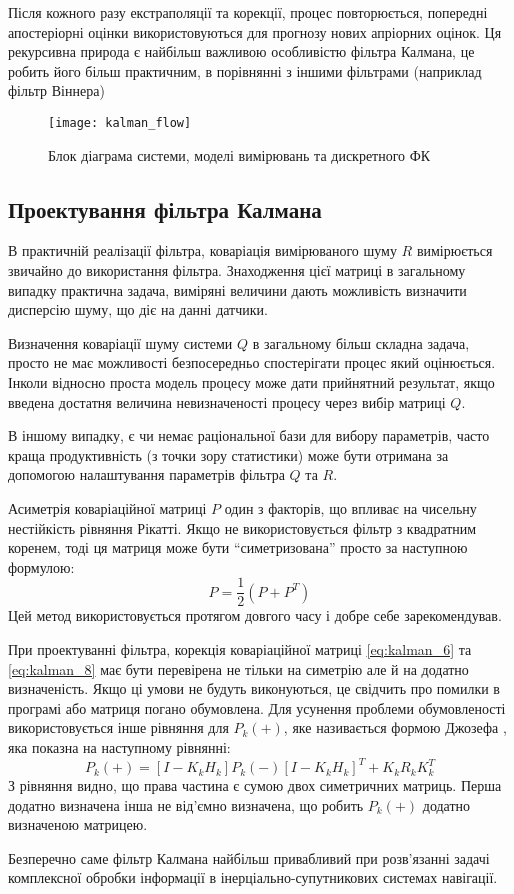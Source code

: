 Після кожного разу екстраполяції та корекції, процес повторюється, попередні
апостеріорні оцінки використовуються для прогнозу нових апріорних оцінок.
Ця рекурсивна природа є найбільш важливою особливістю фільтра Калмана, це робить
його більш практичним, в порівнянні з іншими фільтрами (наприклад фільтр Віннера)
\begin{figure}[here]
\centering
\texttt{[image: kalman\_flow]}
\caption{Блок діаграма системи, моделі вимірювань та дискретного ФК}
\label{fig:kalman_flow}
\end{figure} 

\subsection{Проектування фільтра Калмана}

В практичній реалізації фільтра, коваріація вимірюваного шуму $R$ вимірюється
звичайно до використання фільтра. Знаходження цієї матриці в загальному випадку
практична задача, виміряні величини дають можливість визначити дисперсію шуму, що
діє на данні датчики.

Визначення коваріації шуму системи $Q$ в загальному більш складна задача,
просто не має можливості безпосередньо спостерігати процес який оцінюється.
Інколи відносно проста модель процесу може дати прийнятний результат, якщо
введена достатня величина невизначеності процесу через вибір матриці $Q$.

В іншому випадку, є чи немає раціональної бази для вибору параметрів, часто
краща продуктивність (з точки зору статистики) може бути отримана за допомогою
налаштування параметрів фільтра $Q$ та $R$. 

Асиметрія коваріаційної матриці $P$ один з факторів, що впливає на чисельну
нестійкість рівняння Рікатті. Якщо не використовується фільтр з квадратним
коренем, тоді ця матриця може бути ``симетризована'' просто за наступною 
формулою:
\begin{equation}
 \label{P_symetry}
P= \frac{1}{2}(P+P^{T})
\end{equation}
Цей метод використовується протягом довгого часу і добре себе зарекомендував.

При проектуванні фільтра, корекція коваріаційної матриці \eqref{eq:kalman_6} та
\eqref{eq:kalman_8} має бути перевірена не тільки на симетрію але й на 
додатно визначеність.
Якщо ці умови не будуть виконуються, це свідчить про помилки в програмі або
матриця погано обумовлена. Для усунення проблеми обумовленості використовується
інше рівняння для $P_{k}(+)$, яке називається формою Джозефа \cite{joseph}, яка показна на
наступному рівнянні:
\begin{equation}
 \label{P_plus_Joseph}
P_{k}(+)=[I-K_{k}H_{k}]P_{k}(-)[I-K_{k}H_{k}]^{T}+K_{k}R_{k}K_{k}^{T}
\end{equation}
З рівняння видно, що права частина є сумою двох симетричних матриць.
Перша додатно визначена інша не від'ємно визначена, що робить $P_{k}(+)$ 
додатно визначеною матрицею.

Безперечно саме фільтр Калмана найбільш привабливий при розв’язанні задачі 
комплексної обробки інформації в інерціально-супутникових системах навігації. 
